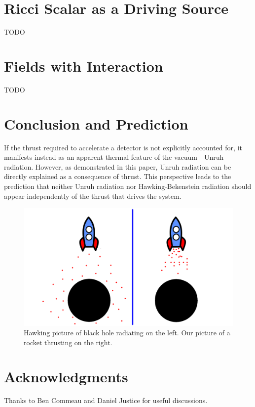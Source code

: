 \documentclass[12pt,a4paper]{article}
\begin{document}
\section{Ricci Scalar as a Driving Source}
TODO
\section{Fields with Interaction}
TODO

\section{Conclusion and Prediction}
If the thrust required to accelerate a detector is not explicitly accounted for, it manifests instead as an apparent thermal feature of the vacuum—Unruh radiation. However, as demonstrated in this paper, Unruh radiation can be directly explained as a consequence of thrust. This perspective leads to the prediction that neither Unruh radiation nor Hawking-Bekenstein radiation should appear independently of the thrust that drives the system.

\begin{figure}[h]
\centering
\includegraphics[scale=0.5]{rocket.png}
\caption{Hawking picture of black hole radiating on the left. Our picture of a rocket thrusting on the right.}
\label{rocket}
\end{figure}

\section{Acknowledgments}
Thanks to Ben Commeau and Daniel Justice for useful discussions.



\end{document}
